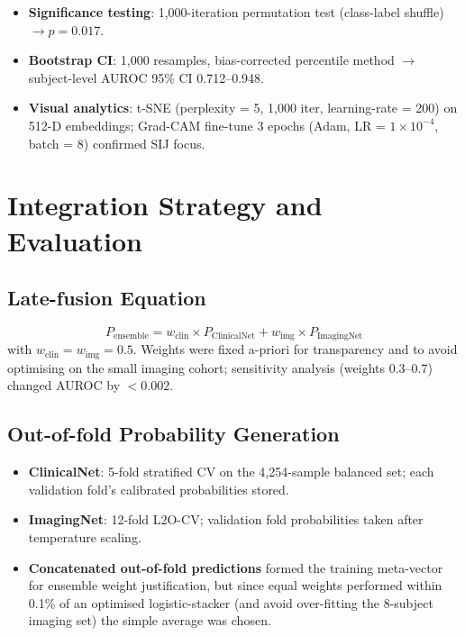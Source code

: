 \documentclass[12pt, a4paper]{article}
\begin{document}
\begin{itemize}
\begin{itemize}
    \end{itemize}
    \item \textbf{Significance testing}: 1,000-iteration permutation test (class-label shuffle) $\rightarrow p = 0.017$.
    \item \textbf{Bootstrap CI}: 1,000 resamples, bias-corrected percentile method $\rightarrow$ subject-level AUROC 95\% CI 0.712–0.948.
    \item \textbf{Visual analytics}: t-SNE (perplexity = 5, 1,000 iter, learning-rate = 200) on 512-D embeddings; Grad-CAM fine-tune 3 epochs (Adam, LR = \( 1 \times 10^{-4} \), batch = 8) confirmed SIJ focus.
\end{itemize}
\clearpage

\section{Integration Strategy and Evaluation}

\subsection{Late-fusion Equation}
\[ P_{\text{ensemble}} = w_{\text{clin}} \times P_{\text{ClinicalNet}} + w_{\text{img}} \times P_{\text{ImagingNet}} \]
with \( w_{\text{clin}} = w_{\text{img}} = 0.5 \). Weights were fixed a-priori for transparency and to avoid optimising on the small imaging cohort; sensitivity analysis (weights 0.3–0.7) changed AUROC by $< 0.002$.

\subsection{Out-of-fold Probability Generation}
\begin{itemize}
    \item \textbf{ClinicalNet}: 5-fold stratified CV on the 4,254-sample balanced set; each validation fold's calibrated probabilities stored.
    \item \textbf{ImagingNet}: 12-fold L2O-CV; validation fold probabilities taken after temperature scaling.
    \item \textbf{Concatenated out-of-fold predictions} formed the training meta-vector for ensemble weight justification, but since equal weights performed within 0.1\% of an optimised logistic-stacker (and avoid over-fitting the 8-subject imaging set) the simple average was chosen.
\end{itemize}
\end{document}
